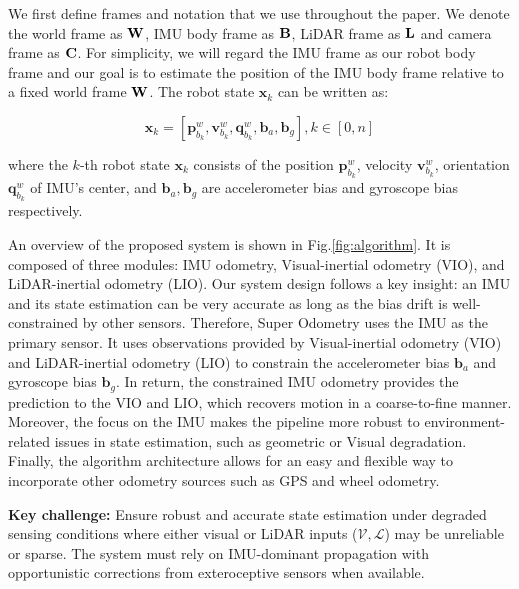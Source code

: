 We first define frames and notation that we use throughout the paper. We denote the world frame as  $\bold{W}$, IMU body frame as $\bold{B}$, LiDAR frame as $\bold{L}$ and camera frame as $\bold{C}$. For simplicity, we will regard the IMU frame as our robot body frame and our goal is to estimate the position of the IMU body frame relative to a fixed world frame $\bold{W}$.
The robot state $\mathbf{x}_{k}$  can be written as:

\begin{equation}
	\mathbf{x}_{k}=\left[\mathbf{p}_{b_{k}}^{w}, \mathbf{v}_{b_{k}}^{w}, \mathbf{q}_{b_{k}}^{w}, \mathbf{b}_{a}, \mathbf{b}_{g}\right], k \in[0, n]
\end{equation}

where the $k$-th robot state $\mathbf{x}_{k}$ consists of the position $\mathbf{p}_{b_{k}}^{w}$, velocity $\mathbf{v}_{b_{k}}^{w}$, orientation $\mathbf{q}_{b_{k}}^{w}$ of IMU's center, and $\mathbf{b}_{a}, \mathbf{b}_{g}$ are accelerometer bias and gyroscope bias respectively.

An overview of the proposed system is shown in Fig.\ref{fig:algorithm}. It is composed of three modules: IMU odometry, Visual-inertial odometry (VIO), 
and LiDAR-inertial odometry (LIO). Our system design follows a key insight: an IMU and its state estimation can be very accurate as long as the bias drift is well-constrained by other sensors. Therefore, Super Odometry uses the IMU as the primary sensor. It uses observations provided by Visual-inertial 
odometry (VIO) and LiDAR-inertial odometry (LIO) to constrain the accelerometer bias $\mathbf{b}_{a}$ and gyroscope bias $\mathbf{b}_{g}$. In return, the constrained IMU 
odometry provides the prediction to the VIO and LIO, which recovers motion in a coarse-to-fine manner. Moreover, the focus on the IMU makes the pipeline more robust to environment-related issues in state estimation, such as geometric or Visual degradation. Finally, the algorithm architecture allows for an easy and flexible way to incorporate other odometry sources such as GPS and wheel odometry.

\textbf{Key challenge:} Ensure robust and accurate state estimation under degraded sensing conditions where either visual or LiDAR inputs (\( \mathcal{V}, \mathcal{L} \)) may be unreliable or sparse. The system must rely on IMU-dominant propagation with opportunistic corrections from exteroceptive sensors when available.







